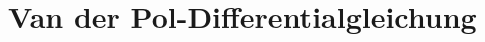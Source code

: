 %
%
%
\chapter{Van der Pol-Differentialgleichung\label{chapter:vanderpol}}
\begin{refsection}







\printbibliography[heading=subbibliography]
\end{refsection}
